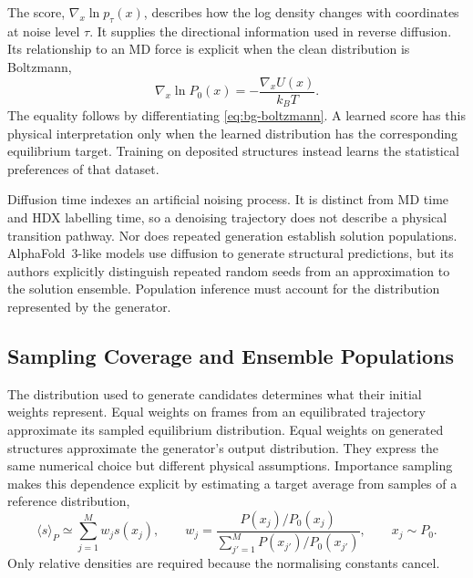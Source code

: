 The score, $\nabla_x\ln p_\tau(x)$, describes how the log density changes with coordinates at noise level $\tau$. It supplies the directional information used in reverse diffusion. Its relationship to an MD force is explicit when the clean distribution is Boltzmann,
\begin{equation}
    \nabla_x\ln P_0(x)=-\frac{\nabla_x U(x)}{k_BT}.
    \label{eq:bg-boltzmann-score}
\end{equation}
The equality follows by differentiating \cref{eq:bg-boltzmann}. A learned score has this physical interpretation only when the learned distribution has the corresponding equilibrium target. Training on deposited structures instead learns the statistical preferences of that dataset.\supercite{bmsb2012ch3,yimDiffusionModelsProtein2024}

Diffusion time indexes an artificial noising process. It is distinct from MD time and HDX labelling time, so a denoising trajectory does not describe a physical transition pathway. Nor does repeated generation establish solution populations. AlphaFold~3-like models use diffusion to generate structural predictions, but its authors explicitly distinguish repeated random seeds from an approximation to the solution ensemble.\supercite{abramsonAccurateStructurePrediction2024} Population inference must account for the distribution represented by the generator.

\subsection{Sampling Coverage and Ensemble Populations}
\label{sec:bg-coverage-populations}

The distribution used to generate candidates determines what their initial weights represent. Equal weights on frames from an equilibrated trajectory approximate its sampled equilibrium distribution. Equal weights on generated structures approximate the generator's output distribution. They express the same numerical choice but different physical assumptions. Importance sampling makes this dependence explicit by estimating a target average from samples of a reference distribution,
\begin{equation}
    \langle s\rangle_P\simeq\sum_{j=1}^{M}w_js(x_j),
    \qquad
    w_j=\frac{P(x_j)/P_0(x_j)}
    {\sum_{j'=1}^{M}P(x_{j'})/P_0(x_{j'})},
    \qquad x_j\sim P_0.
    \label{eq:bg-importance-sampling}
\end{equation}
Only relative densities are required because the normalising constants cancel.\supercite{bmsb2012ch2}

